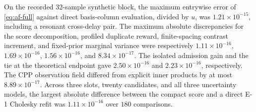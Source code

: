 \begin{afdmremark}
On the recorded 32-sample synthetic block, the maximum entrywise
error of \eqref{eq:af-full} against direct basis-column evaluation,
divided by $u$, was $1.21\times10^{-15}$, including a resonant
cross-delay pair. The maximum absolute discrepancies for the score
decomposition, profiled duplicate reward, finite-spacing contrast
increment, and fixed-prior marginal variance were respectively
$1.11\times10^{-16}$, $1.69\times10^{-16}$, $1.56\times10^{-16}$,
and $8.34\times10^{-17}$. The isolated admission gain and the tie at
the theoretical endpoint gave $2.50\times10^{-16}$ and
$2.23\times10^{-16}$, respectively. The CPP observation field
differed from explicit inner products by at most $8.89\times10^{-17}$.
Across three slots, twenty candidates, and all three uncertainty
models, the largest absolute difference between the compact score
and a direct E-1 Cholesky refit was $1.11\times10^{-16}$ over
$180$ comparisons.
\end{afdmremark}

